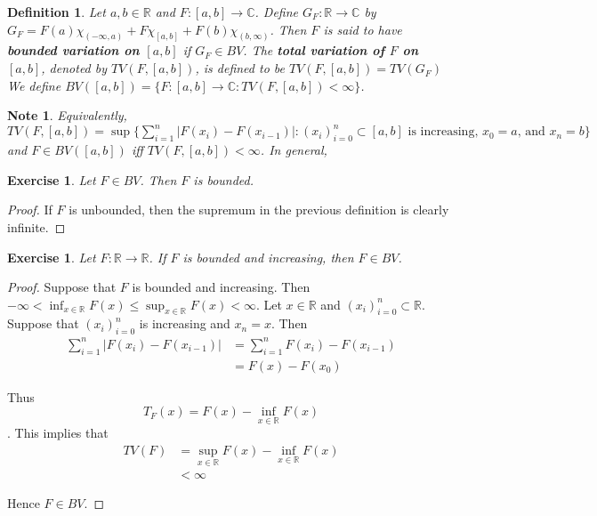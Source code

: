 \documentclass[12pt]{amsart}
\newtheorem{defn}[thm]{Definition}
\newtheorem{note}[thm]{Note}
\newtheorem{ex}[thm]{Exercise}
\newcommand{\C}{\mathbb{C}}
\newcommand{\R}{\mathbb{R}}
\begin{document}
	\begin{defn}
		Let $a,b \in \R$ and $F:[a,b] \rightarrow \C$. Define $G_F:\R \rightarrow \C$ by $G_F = F(a)\chi_{(-\infty,a)} + F\chi_{[a,b]}+F(b)\chi_{(b,\infty)}$. Then $F$ is said to have \textbf{bounded variation on $[a,b]$} if $G_F \in BV$. The \textbf{total variation of $F$ on $[a,b]$}, denoted by $TV(F, [a,b])$, is defined to be $TV(F, [a,b]) = TV(G_F)$ We define $BV([a,b]) = \{F:[a,b] \rightarrow \C: TV(F, [a,b]) < \infty\}$.
	\end{defn}
	
	\begin{note}
		Equivalently, $TV(F, [a,b]) = \sup \big \{\sum_{i=1}^{n}|F(x_{i}) - F(x_{i-1})|: (x_i)_{i=0}^n \subset [a,b] \text{ is increasing, } x_0=a \text{, and } x_n=b\big \}$ and $F \in BV([a,b])$ iff $TV(F, [a,b]) < \infty$. In general, 
	\end{note}
	
	\begin{ex}
		Let $F \in BV$. Then $F$ is bounded.
	\end{ex}
	
	\begin{proof}
		If $F$ is unbounded, then the supremum in the previous definition is clearly infinite.
	\end{proof}
	
	\begin{ex}
		Let $F:\R \rightarrow \R$. If $F$ is bounded and increasing, then $F \in BV$.
	\end{ex}
	
	\begin{proof}
		Suppose that $F$ is bounded and increasing. Then $-\infty<\inf_{x \in \R}F(x) \leq \sup_{x \in \R}F(x)<\infty$. Let $x \in \R$ and $(x_i)_{i=0}^n \subset \R$. Suppose that $(x_i)_{i=0}^n$ is increasing and $x_n=x$. Then 
		\begin{align*}
			\sum_{i=1}^n|F(x_i)-F(x_{i-1})| 
			&= \sum_{i=1}^n F(x_i)-F(x_{i-1})\\
			&= F(x)-F(x_0)
		\end{align*}
		
		Thus $$T_F(x) = F(x)-\inf_{x \in \R}F(x)$$. This implies that 
		\begin{align*}
			TV(F) 
			&= \sup_{x \in \R}F(x)-\inf_{x \in \R}F(x)\\
			&<\infty
		\end{align*}
		
		Hence $F \in BV$.
	\end{proof}
	
\end{document}

